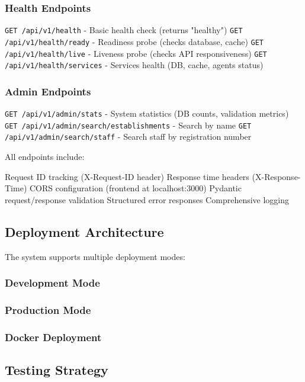 \documentclass[conference]{IEEEtran}
\begin{document}
\subsubsection{Health Endpoints}

\texttt{GET /api/v1/health} - Basic health check (returns "healthy")
\texttt{GET /api/v1/health/ready} - Readiness probe (checks database, cache)
\texttt{GET /api/v1/health/live} - Liveness probe (checks API responsiveness)
\texttt{GET /api/v1/health/services} - Services health (DB, cache, agents status)

\subsubsection{Admin Endpoints}

\texttt{GET /api/v1/admin/stats} - System statistics (DB counts, validation metrics)
\texttt{GET /api/v1/admin/search/establishments} - Search by name
\texttt{GET /api/v1/admin/search/staff} - Search staff by registration number

All endpoints include:

Request ID tracking (X-Request-ID header)
Response time headers (X-Response-Time)
CORS configuration (frontend at localhost:3000)
Pydantic request/response validation
Structured error responses
Comprehensive logging

\subsection{Deployment Architecture}

The system supports multiple deployment modes:

\subsubsection{Development Mode}

\subsubsection{Production Mode}

\subsubsection{Docker Deployment}

\subsection{Testing Strategy}
\end{document}
